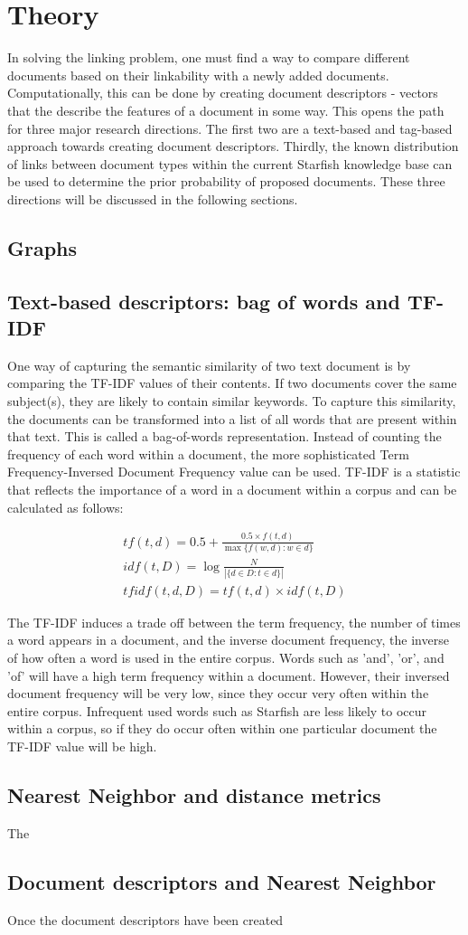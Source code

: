 \section{Theory}

In solving the linking problem, one must find a way to compare different documents based on their linkability with a newly added documents. Computationally, this can be done by creating document descriptors - vectors that the describe the features of a document in some way. This opens the path for three major research directions. The first two are a text-based and tag-based approach towards creating document descriptors. Thirdly, the known distribution of links between document types within the current Starfish knowledge base can be used to determine the prior probability of proposed documents. These three directions will be discussed in the following sections. 

\subsection{Graphs}

\subsection{Text-based descriptors: bag of words and TF-IDF}
One way of capturing the semantic similarity of two text document is by comparing the TF-IDF values of their contents. If two documents cover the same subject(s), they are likely to contain similar keywords. To capture this similarity, the documents can be transformed into a list of all words that are present within that text. This is called a bag-of-words representation. Instead of counting the frequency of each word within a document, the more sophisticated Term Frequency-Inversed Document Frequency value can be used. TF-IDF is a statistic that reflects the importance of a word in a document within a corpus and can be calculated as follows:

\begin{align}
\nonumber {tf}(t,d) = 0.5 + \frac{0.5 \times {f}(t, d)}{\max\{{f}(w, d):w \in d\}}\\
\nonumber {idf}(t, D) =  \log \frac{N}{|\{d \in D: t \in d\}|}\\
\nonumber {tfidf}(t,d,D) = {tf}(t,d) \times {idf}(t, D)
\end{align}

The TF-IDF induces a trade off between the term frequency, the number of times a word appears in a document, and the inverse document frequency, the inverse of how often a word is used in the entire corpus. Words such as 'and', 'or', and 'of' will have a high term frequency within a document. However, their inversed document frequency will be very low, since they occur very often within the entire corpus. Infrequent used words such as Starfish are less likely to occur within a corpus, so if they do occur often within one particular document the TF-IDF value will be high. 

\subsection{Nearest Neighbor and distance metrics}
The 



\subsection{Document descriptors and Nearest Neighbor}
Once the document descriptors have been created
